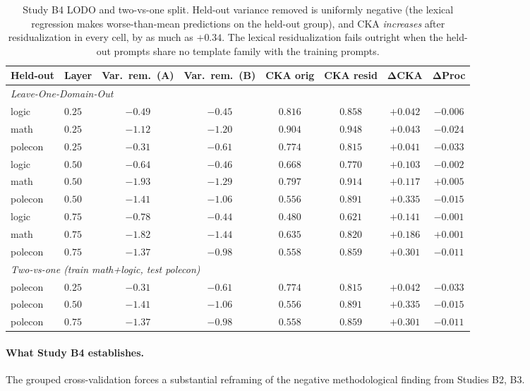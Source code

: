 \begin{table}[h]
\centering
\caption{Study B4 LODO and two-vs-one split. Held-out variance
removed is uniformly negative (the lexical regression makes
worse-than-mean predictions on the held-out group), and CKA
\emph{increases} after residualization in every cell, by as much as
$+0.34$. The lexical residualization fails outright when the held-out
prompts share no template family with the training prompts.}
\label{tab:study-b4-lodo}
\begin{tabular}{l l c c c c c c}
\toprule
Held-out & Layer & Var.\ rem.\ (A) & Var.\ rem.\ (B) & CKA orig & CKA resid & ΔCKA & ΔProc \\
\midrule
\multicolumn{8}{l}{\emph{Leave-One-Domain-Out}} \\
logic   & $0.25$ & $-0.49$ & $-0.45$ & $0.816$ & $0.858$ & $+0.042$ & $-0.006$ \\
math    & $0.25$ & $-1.12$ & $-1.20$ & $0.904$ & $0.948$ & $+0.043$ & $-0.024$ \\
polecon & $0.25$ & $-0.31$ & $-0.61$ & $0.774$ & $0.815$ & $+0.041$ & $-0.033$ \\
logic   & $0.50$ & $-0.64$ & $-0.46$ & $0.668$ & $0.770$ & $+0.103$ & $-0.002$ \\
math    & $0.50$ & $-1.93$ & $-1.29$ & $0.797$ & $0.914$ & $+0.117$ & $+0.005$ \\
polecon & $0.50$ & $-1.41$ & $-1.06$ & $0.556$ & $0.891$ & $+0.335$ & $-0.015$ \\
logic   & $0.75$ & $-0.78$ & $-0.44$ & $0.480$ & $0.621$ & $+0.141$ & $-0.001$ \\
math    & $0.75$ & $-1.82$ & $-1.44$ & $0.635$ & $0.820$ & $+0.186$ & $+0.001$ \\
polecon & $0.75$ & $-1.37$ & $-0.98$ & $0.558$ & $0.859$ & $+0.301$ & $-0.011$ \\
\midrule
\multicolumn{8}{l}{\emph{Two-vs-one (train math+logic, test polecon)}} \\
polecon & $0.25$ & $-0.31$ & $-0.61$ & $0.774$ & $0.815$ & $+0.042$ & $-0.033$ \\
polecon & $0.50$ & $-1.41$ & $-1.06$ & $0.556$ & $0.891$ & $+0.335$ & $-0.015$ \\
polecon & $0.75$ & $-1.37$ & $-0.98$ & $0.558$ & $0.859$ & $+0.301$ & $-0.011$ \\
\bottomrule
\end{tabular}
\end{table}

\paragraph{What Study B4 establishes.} The grouped cross-validation
forces a substantial reframing of the negative methodological finding
from Studies B2, B3.

